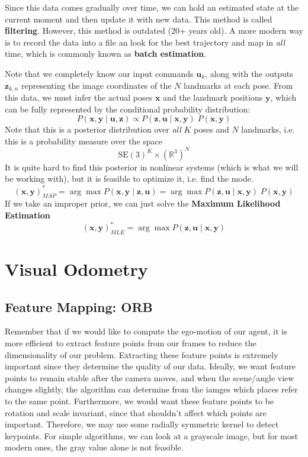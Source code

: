 \documentclass{article}
\theoremstyle{definition}
\theoremstyle{remark}
\theoremstyle{definition}
\begin{document}
Since this data comes gradually over time, we can hold an estimated state at the current moment and then update it with new data. This method is called \textbf{filtering}. However, this method is outdated (20+ years old). A more modern way is to record the data into a file an look for the best trajectory and map in \textit{all} time, which is commonly known as \textbf{batch estimation}. 

Note that we completely know our input commands $\mathbf{u}_k$, along with the outputs $\mathbf{z}_{k, n}$ representing the image coordinates of the $N$ landmarks at each pose. From this data, we must infer the actual poses $\mathbf{x}$ and the landmark positions $\mathbf{y}$, which can be fully represented by the conditional probability distribution: 
\[P(\mathbf{x}, \mathbf{y} \mid \mathbf{u}, \mathbf{z}) \propto P(\mathbf{z}, \mathbf{u} \mid \mathbf{x}, \mathbf{y}) \; P (\mathbf{x}, \mathbf{y})\]
Note that this is a posterior distribution over \textit{all} $K$ poses and $N$ landmarks, i.e. this is a probability measure over the space 
\[\mathrm{SE}(3)^K \times (\mathbb{R}^3)^N\]
It is quite hard to find this posterior in nonlinear systems (which is what we will be working with), but it is feasible to optimize it, i.e. find the mode. 
\[(\mathbf{x}, \mathbf{y})^*_{MAP} = \arg \max P(\mathbf{x}, \mathbf{y} \mid \mathbf{z}, \mathbf{u}) = \arg \max P(\mathbf{z}, \mathbf{u} \mid \mathbf{x}, \mathbf{y}) \; P(\mathbf{x}, \mathbf{y})\]
If we take an improper prior, we can just solve the \textbf{Maximum Likelihood Estimation} 
\[(\mathbf{x}, \mathbf{y})^*_{MLE} = \arg \max P(\mathbf{z}, \mathbf{u} \mid \mathbf{x}, \mathbf{y})\]


\section{Visual Odometry}

\subsection{Feature Mapping: ORB}

Remember that if we would like to compute the ego-motion of our agent, it is more efficient to extract feature points from our frames to reduce the dimensionality of our problem. Extracting these feature points is extremely important since they determine the quality of our data. Ideally, we want feature points to remain stable after the camera moves, and when the scene/angle view changes slightly, the algorithm can determine from the iamges which places refer to the same point. Furthermore, we would want these feature points to be rotation and scale invariant, since that shouldn't affect which points are important. Therefore, we may use some radially symmetric kernel to detect keypoints. For simple algorithms, we can look at a grayscale image, but for most modern ones, the gray value alone is not feasible.
\end{document}
